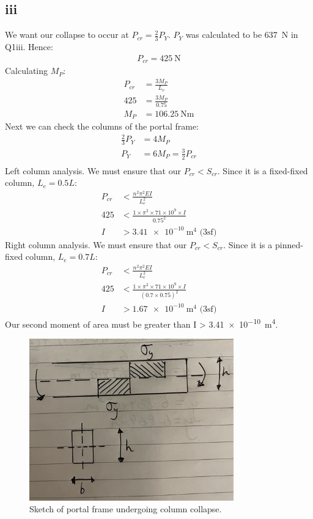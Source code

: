 \documentclass[11pt]{article}
\numberwithin{equation}{section}
\begin{document}
\subsection{iii}
We want our collapse to occur at $P_{cr} = \frac{2}{3}P_Y$. $P_Y$ was calculated to be \SI{637}{\newton} in Q1iii. Hence:
\begin{align}
    P_{cr} = \SI{425}{\newton}
\end{align}
Calculating $M_P$:
\begin{align}
    P_{cr} &= \frac{3M_P}{L_v}\\
    425 &= \frac{3M_P}{0.75}\\
    M_P &= \SI{106.25}{\newton\meter}
\end{align}
Next we can check the columns of the portal frame:
\begin{align}
    \frac{2}{3}P_Y &= 4M_P\\
    P_Y &= 6M_P = \frac{3}{2}P_{cr}\\
\end{align}
Left column analysis. We must ensure that our $P_{cr} < S_{cr}$. Since it is a fixed-fixed column, $L_e = 0.5L$:
\begin{align}
    P_{cr} &< \frac{n^2 \pi^2 E I}{L_e^2}\\
    425 &< \frac{1 \times \pi^2 \times 71 \times 10^9 \times I}{0.75^2}\\
    I &> \SI{3.41e-10}{\meter\tothe{4}} \textrm{ (3sf)}
\end{align}
Right column analysis. We must ensure that our $P_{cr} < S_{cr}$. Since it is a pinned-fixed column, $L_e = 0.7L$:
\begin{align}
    P_{cr} &< \frac{n^2 \pi^2 E I}{L_e^2}\\
    425 &< \frac{1 \times \pi^2 \times 71 \times 10^9 \times I}{(0.7\times 0.75)^2}\\
    I &> \SI{1.67e-10}{\meter\tothe{4}} \textrm{ (3sf)}
\end{align}
Our second moment of area must be greater than I > \SI{3.41e-10}{\meter\tothe{4}}.
\begin{figure}[H]
    \centering
    \includegraphics[height = 7cm]{./img/q3iii1.jpg}
    \caption{Sketch of portal frame undergoing column collapse.}
\end{figure}
\end{document}
